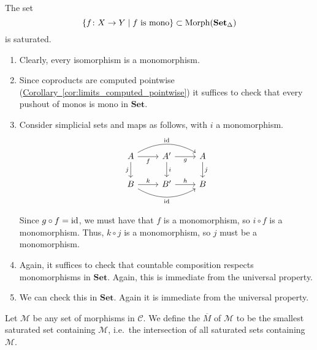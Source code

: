 \documentclass[main.tex]{subfiles}
\begin{document}
\begin{example}
  \label{eg:monomorphisms_are_saturated}
  The set
  \begin{equation*}
    \{f\colon X \to Y \mid f \text{ is mono}\} \subset \mathrm{Morph}(\operatorname{\mathbf{Set}_{\Delta}})
  \end{equation*}
  is saturated.
  \begin{enumerate}
    \item Clearly, every isomorphism is a monomorphism.

    \item Since coproducts are computed pointwise (\hyperref[cor:limits_computed_pointwise]{Corollary~\ref*{cor:limits_computed_pointwise}}) it suffices to check that every pushout of monos is mono in $\mathbf{Set}$.

    \item Consider simplicial sets and maps as follows, with $i$ a monomorphism.
      \begin{equation*}
        \begin{tikzcd}
          A
          \arrow[r, swap, "f"]
          \arrow[rr, bend left, "\id"]
          \arrow[d, swap, "j"]
          & A'
          \arrow[r, swap, "g"]
          \arrow[d, "i"]
          & A
          \arrow[d, "j"]
          \\
          B
          \arrow[rr, bend right, swap, "\id"]
          \arrow[r, "k"]
          & B'
          \arrow[r, "h"]
          & B
        \end{tikzcd}
      \end{equation*}

      Since $g \circ f = \mathrm{id}$, we must have that $f$ is a monomorphism, so $i \circ f$ is a monomorphism. Thus, $k \circ j$ is a monomorphism, so $j$ must be a monomorphism.

    \item Again, it suffices to check that countable composition respects monomorphisms in $\mathbf{Set}$. Again, this is immediate from the universal property.

    \item We can check this in $\mathbf{Set}$. Again it is immediate from the universal property.
  \end{enumerate}
\end{example}

\begin{definition}
  \label{def:saturated_hull}
  Let $\mathcal{M}$ be any set of morphisms in $\mathcal{C}$. We define the  $\overline{M}$ of $\mathcal{M}$ to be the smallest saturated set containing $\mathcal{M}$, i.e.\ the intersection of all saturated sets containing $\mathcal{M}$.
\end{definition}
\end{document}
